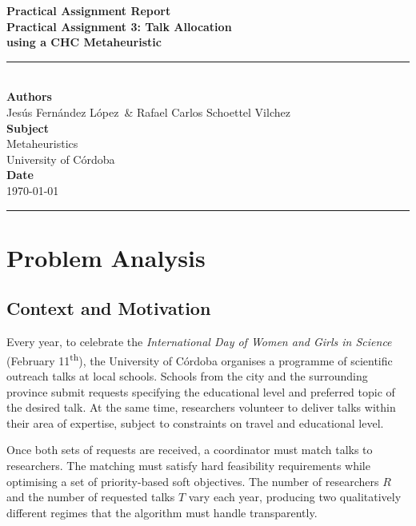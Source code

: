 \documentclass[12pt, a4paper]{article}
\newcommand{\reporttitle}{Practical Assignment 3: Talk Allocation\\[0.3cm]
\large using a CHC Metaheuristic}
\newcommand{\reportdate}{\today}
\newcommand{\authorA}{Jesús Fernández López}
\newcommand{\authorB}{Rafael Carlos Schoettel Vilchez}
\begin{document}
\begin{titlepage}
  \centering
  \vspace*{3cm}
  {\Huge \textbf{Practical Assignment Report}}\\[0.8cm]
  {\LARGE \textbf{\reporttitle}}\\[0.5cm]
  \rule{\textwidth}{0.4pt}\\[2cm]
  {\Large \textbf{Authors}}\\[0.4cm]
  {\large \authorA\ \& \authorB}\\[1.5cm]
  {\Large \textbf{Subject}}\\[0.4cm]
  {\large Metaheuristics}\\[0.4cm]
  {\normalsize University of Córdoba}\\[1.5cm]
  {\Large \textbf{Date}}\\[0.4cm]
  {\large \reportdate}
  \vfill
  \rule{\textwidth}{0.4pt}
\end{titlepage}

\newpage
\tableofcontents
\newpage

\section{Problem Analysis}

\subsection{Context and Motivation}

Every year, to celebrate the \textit{International Day of Women and Girls in Science}
(February 11\textsuperscript{th}), the University of Córdoba organises a programme of
scientific outreach talks at local schools. Schools from the city and the surrounding
province submit requests specifying the educational level and preferred topic of the
desired talk. At the same time, researchers volunteer to deliver talks within their
area of expertise, subject to constraints on travel and educational level.

Once both sets of requests are received, a coordinator must match talks to researchers.
The matching must satisfy hard feasibility requirements while optimising a set of
priority-based soft objectives. The number of researchers $R$ and the number of
requested talks $T$ vary each year, producing two qualitatively different regimes that
the algorithm must handle transparently.
\end{document}
